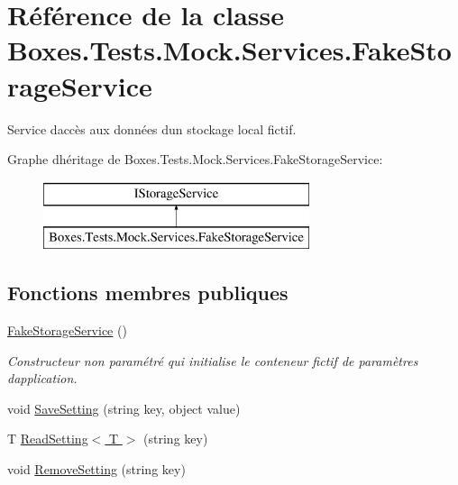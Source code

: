 \hypertarget{class_boxes_1_1_tests_1_1_mock_1_1_services_1_1_fake_storage_service}{}\section{Référence de la classe Boxes.\+Tests.\+Mock.\+Services.\+Fake\+Storage\+Service}
\label{class_boxes_1_1_tests_1_1_mock_1_1_services_1_1_fake_storage_service}


Service d\textquotesingle{}accès aux données d\textquotesingle{}un stockage local fictif.  


Graphe d\textquotesingle{}héritage de Boxes.\+Tests.\+Mock.\+Services.\+Fake\+Storage\+Service\+:\begin{figure}[H]
\begin{center}
\leavevmode
\includegraphics[height=2.000000cm]{class_boxes_1_1_tests_1_1_mock_1_1_services_1_1_fake_storage_service}
\end{center}
\end{figure}
\subsection*{Fonctions membres publiques}
\begin{DoxyCompactItemize}
\item 
\hyperlink{class_boxes_1_1_tests_1_1_mock_1_1_services_1_1_fake_storage_service_a8a290ba0137da5e8f3f30fe90bd870a0}{Fake\+Storage\+Service} ()
\begin{DoxyCompactList}\small\item\em Constructeur non paramétré qui initialise le conteneur fictif de paramètres d\textquotesingle{}application. \end{DoxyCompactList}\item 
void \hyperlink{class_boxes_1_1_tests_1_1_mock_1_1_services_1_1_fake_storage_service_a5f3f15f8bcc6835b7eb956031a59b1d3}{Save\+Setting} (string key, object value)
\item 
T \hyperlink{class_boxes_1_1_tests_1_1_mock_1_1_services_1_1_fake_storage_service_ac4e7fddd7ea20113f45135d2d755bef7}{Read\+Setting$<$ T $>$} (string key)
\item 
void \hyperlink{class_boxes_1_1_tests_1_1_mock_1_1_services_1_1_fake_storage_service_a87e61ad9310b981eb1196624b07a3255}{Remove\+Setting} (string key)
\end{DoxyCompactItemize}
